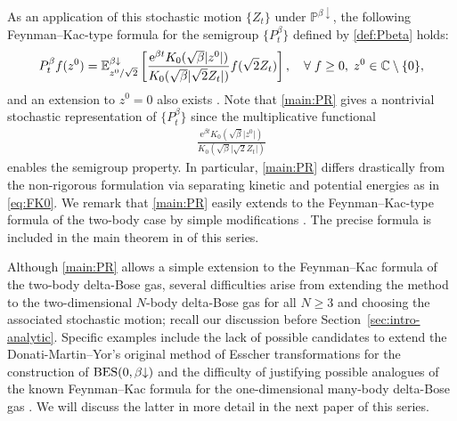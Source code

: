 \documentclass[12pt, twoside]{article}
\numberwithin{figure}{section}
\newcommand{\BES}{{\rm BES}}
\newcommand{\e}{{\mathrm e}}
\newcommand{\1}{\mathds 1}
\newcommand{\da}{{\downarrow}}
\renewcommand{\P}{{\mathbb P}}
\newcommand{\E}{{\mathbb E}}
\newcommand{\2}{{\mathbf 1}}
\newcommand{\two}{{\sqrt{2}}}
\begin{document}
As an application of this stochastic motion $\{Z_t\}$ under $\P^{\beta\da}$, the following Feynman--Kac-type formula for the semigroup $\{P^\beta_t\}$ defined by \eqref{def:Pbeta}
holds:
\begin{align}\label{main:PR}
P^\beta_tf(z^0)=\E^{\beta\da}_{z^0/\two}\left[\frac{\e^{\beta t}K_0(\sqrt{\beta}\lvert z^0 \rvert)}{K_0(\sqrt{\beta}\lvert \two Z_t\rvert)}f(\two Z_t)\right],\quad \forall\;f\geq 0,\;z^0\in \Bbb C\setminus\{0\},
\end{align}
and an extension to $z^0=0$ also exists \cite[Theorem~2.10]{C:BES}.
Note that \eqref{main:PR} gives a nontrivial stochastic representation of $\{P^\beta_t\}$ since the multiplicative functional 
\begin{align}\label{multi:2}
\frac{\e^{\beta t}K_0(\sqrt{\beta}\lvert z^0 \rvert)}{K_0(\sqrt{\beta}\lvert \two Z_t\rvert)}
\end{align}
enables the semigroup property.
In particular, \eqref{main:PR} differs drastically from the non-rigorous formulation via separating kinetic and potential energies as in \eqref{eq:FK0}. We remark that \eqref{main:PR} easily extends to the Feynman--Kac-type formula of the two-body case by simple modifications \cite[Section~2.3]{C:DBG}. The precise formula is included in the main theorem in \cite{C:SDBG3} of this series.  

Although \eqref{main:PR} allows a simple extension to the Feynman--Kac formula of the two-body delta-Bose gas, several difficulties arise from extending the method to the two-dimensional $N$-body delta-Bose gas for all $N\geq 3$ and choosing the associated stochastic motion; recall our discussion before Section~\ref{sec:intro-analytic}.
 Specific examples include the lack of possible candidates to extend the Donati-Martin--Yor's original method of Esscher transformations for the construction of $\BES(0,\beta\da)$ \cite{DY:Krein} and the difficulty of justifying possible analogues of the known Feynman--Kac formula for the one-dimensional many-body delta-Bose gas \cite[Remark~2.3]{C:BES}. We will discuss the latter in more detail in the next paper \cite{C:SDBG2} of this series. 
\end{document}
